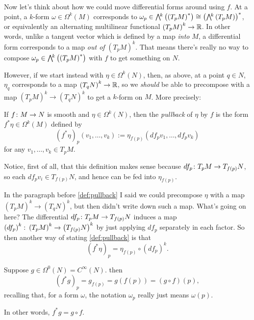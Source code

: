 Now let's think about how we could move differential forms around using $f$. At a point, a $k$-form $\omega \in \Omega^k(M)$ corresponds to $\omega_p \in \ext{k}\left(\left(T_pM\right)^\ast\right) \cong \left(\ext{k}\left(T_pM\right)\right)^\ast$, or equivalently an alternating multilinear functional $\left(T_pM\right)^k \to \mathbb{R}$. In other words, unlike a tangent vector which is defined by a map \emph{into} $M$, a differential form corresponds to a map \emph{out of} $\left(T_pM\right)^k$. That means there's really no way to compose $\omega_p \in \ext{k}\left(\left(T_pM\right)^\ast\right)$ with $f$ to get something on $N$.

However, if we start instead with $\eta \in \Omega^k(N)$, then, as above, at a point $q \in N$, $\eta_q$ corresponds to a map $\left(T_qN\right)^k \to \mathbb{R}$, so we \emph{should} be able to precompose with a map $\left(T_pM\right)^k \to \left(T_q N \right)^k$ to get a $k$-form on $M$. More precisely:

\begin{definition}\label{def:pullback}
	If $f \colon\thinspace\! M \to N$ is smooth and $\eta \in \Omega^k(N)$, then the \emph{pullback} of $\eta$ by $f$ is the form $f^\ast \eta \in \Omega^k(M)$ defined by
	\[
		(f^\ast \eta)_p(v_1, \dots , v_k) := \eta_{f(p)}(df_p v_1, \dots, df_pv_k)
	\]
	for any $v_1, \dots , v_k \in T_pM$.
\end{definition}

Notice, first of all, that this definition makes sense because $df_p\colon\thinspace\! T_pM \to T_{f(p)}N$, so each $df_p v_i \in T_{f(p)}N$, and hence can be fed into $\eta_{f(p)}$. 

In the paragraph before \cref{def:pullback} I said we could precompose $\eta$ with a map $\left(T_pM\right)^k \to \left(T_q N \right)^k$, but then didn't write down such a map. What's going on here? The differential $df_p \colon\thinspace\! T_p M \to T_{f(p)}N$ induces a map $\left(df_p\right)^k \colon\thinspace\! \left(T_p M\right)^k \to \left(T_{f(p)}N\right)^k$ by just applying $df_p$ separately in each factor. So then another way of stating \cref{def:pullback} is that 
\[ 
	(f^\ast \eta)_p = \eta_{f(p)} \circ (df_p)^k.
\]

\begin{example}\label{ex:pullbacks of functions are compositions}
	Suppose $g \in \Omega^0(N) = C^\infty(N)$. then 
	\[
		(f^\ast g)_p = g_{f(p)} = g(f(p)) = (g \circ f)(p),
	\]
	recalling that, for a form $\omega$, the notation $\omega_p$ really just means $\omega(p)$.
	
	In other words, $f^\ast g = g \circ f$.
\end{example}

